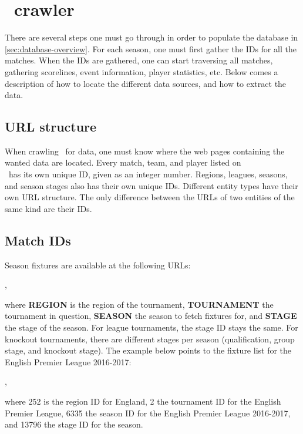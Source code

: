 \section{\whoscoredplain\ crawler}

There are several steps one must go through in order to populate the database in \cref{sec:database-overview}. For each season, one must first gather the IDs for all the matches. When the IDs are gathered, one can start traversing all matches, gathering scorelines, event information, player statistics, etc. Below comes a description of how to locate the different data sources, and how to extract the data.


\subsection{URL structure}

When crawling \whoscored\  for data, one must know where the web pages containing the wanted data are located. Every match, team, and player listed on \\ \whoscored\ has its own unique ID, given as an integer number. Regions, leagues, seasons, and season stages also has their own unique IDs. Different entity types have their own URL structure. The only difference between the URLs of two entities of the same kind are their IDs.


\subsection{Match IDs}

Season fixtures are available at the following URLs:

,

where \textbf{REGION} is the region of the tournament, \textbf{TOURNAMENT} the tournament in question, \textbf{SEASON} the season to fetch fixtures for, and \textbf{STAGE} the stage of the season. For league tournaments, the stage ID stays the same. For knockout tournaments, there are different stages per season (qualification, group stage, and knockout stage). The example below points to the fixture list for the English Premier League 2016-2017:

,

where 252 is the region ID for England, 2 the tournament ID for the English Premier League, 6335 the season ID for the English Premier League 2016-2017, and 13796 the stage ID for the season.

